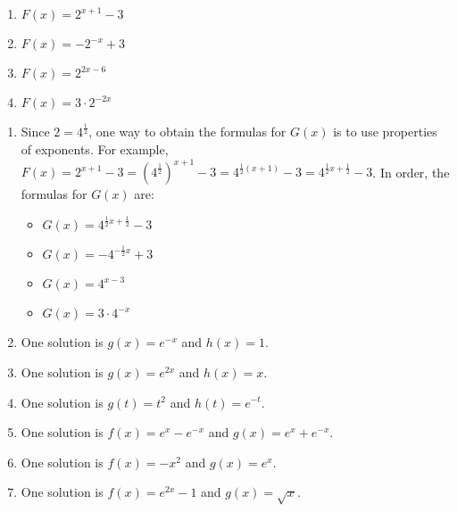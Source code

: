 \begin{multicols}{4}
\begin{enumerate}
\setcounter{enumi}{\value{HW}}

\item $F(x) = 2^{x+1}-3$

\item  $F(x) = -2^{-x} + 3$

\item $F(x) = 2^{2x-6}$

\item  $F(x) =3 \cdot 2^{-2x}$

\setcounter{HW}{\value{enumi}}
\end{enumerate}
\end{multicols}

\begin{enumerate}
\setcounter{enumi}{\value{HW}}

\item  Since $2 = 4^{\frac{1}{2}}$, one way to obtain the formulas for $G(x)$ is to use properties of exponents.  For example, $F(x) = 2^{x+1}-3 = \left(4^{\frac{1}{2}}\right)^{x+1} -3 = 4^{\frac{1}{2}(x+1)} - 3 = 4^{\frac{1}{2} x + \frac{1}{2}} - 3$.  In order, the formulas for $G(x)$ are:

\begin{multicols}{4}
\begin{itemize}

\item $G(x) = 4^{\frac{1}{2}x+\frac{1}{2}}-3$

\item  $G(x) = -4^{-\frac{1}{2} x} + 3$

\item $G(x) = 4^{x-3}$

\item  $G(x) =3 \cdot 4^{-x}$

\end{itemize}
\end{multicols}

\addtocounter{enumi}{1}

\item  One solution is $g(x)  = e^{-x}$ and $h(x) = 1$.
\item  One solution is $g(x) = e^{2x}$ and $h(x) = x$.
\item  One solution is $g(t) = t^2$ and $h(t) = e^{-t}$.
\item  One solution is $f(x) = e^{x} - e^{-x}$ and $g(x) = e^{x}+e^{-x}$.
\item  One solution is $f(x) = -x^2$ and $g(x) = e^{x}$.
\item  One solution is $f(x) = e^{2x} -1$ and $g(x) = \sqrt{x}$.  



\end{enumerate}
